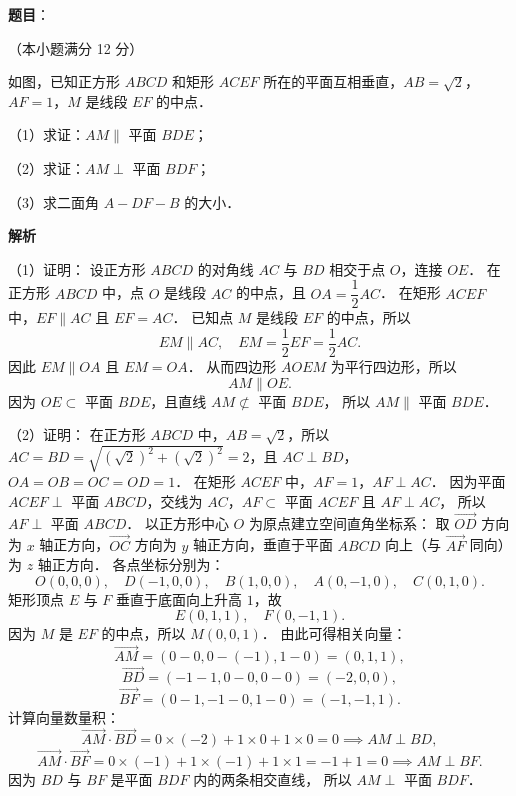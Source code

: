 \begin{answer}

\textbf{题目}：

（本小题满分 12 分）

如图，已知正方形 $ABCD$ 和矩形 $ACEF$ 所在的平面互相垂直，$AB = \sqrt{2}$，$AF = 1$，$M$ 是线段 $EF$ 的中点．

（1）求证：$AM \parallel$ 平面 $BDE$；

（2）求证：$AM \perp$ 平面 $BDF$；

（3）求二面角 $A - DF - B$ 的大小．
\nopagebreak[4]
\begin{center}\end{center}
\nopagebreak[4]
\textbf{解析}
\nopagebreak[4]
\begin{center}\end{center}
\nopagebreak[4]
（1）证明：
设正方形 $ABCD$ 的对角线 $AC$ 与 $BD$ 相交于点 $O$，连接 $OE$．
在正方形 $ABCD$ 中，点 $O$ 是线段 $AC$ 的中点，且 $OA = \dfrac{1}{2}AC$．
在矩形 $ACEF$ 中，$EF \parallel AC$ 且 $EF = AC$．
已知点 $M$ 是线段 $EF$ 的中点，所以
\nopagebreak[4]
\[
EM \parallel AC, \quad EM = \frac{1}{2}EF = \frac{1}{2}AC.
\]
因此 $EM \parallel OA$ 且 $EM = OA$．
从而四边形 $AOEM$ 为平行四边形，所以
\nopagebreak[4]
\[
AM \parallel OE.
\]
因为 $OE \subset$ 平面 $BDE$，且直线 $AM \not\subset$ 平面 $BDE$，
所以 $AM \parallel$ 平面 $BDE$．

（2）证明：
在正方形 $ABCD$ 中，$AB = \sqrt{2}$，所以 $AC = BD = \sqrt{(\sqrt{2})^2 + (\sqrt{2})^2} = 2$，且 $AC \perp BD$，$OA = OB = OC = OD = 1$．
在矩形 $ACEF$ 中，$AF = 1$，$AF \perp AC$．
因为平面 $ACEF \perp$ 平面 $ABCD$，交线为 $AC$，$AF \subset$ 平面 $ACEF$ 且 $AF \perp AC$，
所以 $AF \perp$ 平面 $ABCD$．
以正方形中心 $O$ 为原点建立空间直角坐标系：
取 $\vec{OD}$ 方向为 $x$ 轴正方向，$\vec{OC}$ 方向为 $y$ 轴正方向，垂直于平面 $ABCD$ 向上（与 $\vec{AF}$ 同向）为 $z$ 轴正方向．
各点坐标分别为：
\nopagebreak[4]
\[
O(0, 0, 0), \quad D(-1, 0, 0), \quad B(1, 0, 0), \quad A(0, -1, 0), \quad C(0, 1, 0).
\]
矩形顶点 $E$ 与 $F$ 垂直于底面向上升高 $1$，故
\nopagebreak[4]
\[
E(0, 1, 1), \quad F(0, -1, 1).
\]
因为 $M$ 是 $EF$ 的中点，所以 $M(0, 0, 1)$．
由此可得相关向量：
\nopagebreak[4]
\[
\vec{AM} = (0 - 0, 0 - (-1), 1 - 0) = (0, 1, 1),
\]
\nopagebreak[4]
\[
\vec{BD} = (-1 - 1, 0 - 0, 0 - 0) = (-2, 0, 0),
\]
\nopagebreak[4]
\[
\vec{BF} = (0 - 1, -1 - 0, 1 - 0) = (-1, -1, 1).
\]
计算向量数量积：
\nopagebreak[4]
\[
\vec{AM} \cdot \vec{BD} = 0 \times (-2) + 1 \times 0 + 1 \times 0 = 0 \implies AM \perp BD,
\]
\nopagebreak[4]
\[
\vec{AM} \cdot \vec{BF} = 0 \times (-1) + 1 \times (-1) + 1 \times 1 = -1 + 1 = 0 \implies AM \perp BF.
\]
因为 $BD$ 与 $BF$ 是平面 $BDF$ 内的两条相交直线，
所以 $AM \perp$ 平面 $BDF$．


\end{answer}

